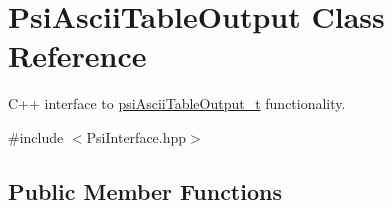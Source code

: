 \hypertarget{classPsiAsciiTableOutput}{}\section{Psi\+Ascii\+Table\+Output Class Reference}
\label{classPsiAsciiTableOutput}


C++ interface to \hyperlink{structpsiAsciiTableOutput__t}{psi\+Ascii\+Table\+Output\+\_\+t} functionality.  




{\ttfamily \#include $<$Psi\+Interface.\+hpp$>$}

\subsection*{Public Member Functions}

